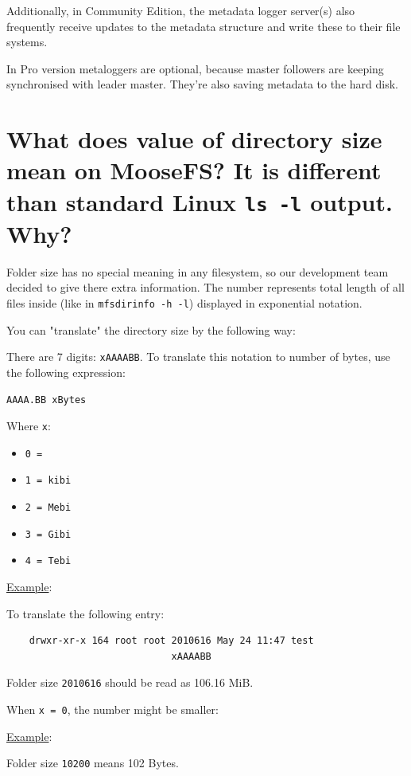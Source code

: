 \documentclass[a4paper,11pt,english]{report}
\def\code#1{\texttt{#1}}
\begin{document}
		Additionally, in Community Edition, the metadata logger server(s) also frequently receive updates to the metadata structure and write these to their file systems.
		
		In Pro version metaloggers are optional, because master followers are keeping synchronised with leader master. They're also saving metadata to the hard disk.
		
		\section{What does value of directory size mean on MooseFS? It is different than standard Linux \code{ls -l} output. Why?}
		Folder size has no special meaning in any filesystem, so our development team decided to give there extra information. The number represents total length of all files inside (like in \code{mfsdirinfo -h -l}) displayed in exponential notation.

		You can "translate" the directory size by the following way:

		There are 7 digits: \code{xAAAABB}. To translate this notation to number of bytes, use the following expression:

		\code{AAAA.BB xBytes}
		
		Where \code{x}:
		\begin{itemize}
			\item \code{0 =}
			\item \code{1 = kibi}
			\item \code{2 = Mebi}
			\item \code{3 = Gibi}
			\item \code{4 = Tebi}
		\end{itemize}

		\bigskip

		\underline{Example}:
		
		To translate the following entry:
		
		\begin{lstlisting}
	drwxr-xr-x 164 root root 2010616 May 24 11:47 test
	                         xAAAABB
		\end{lstlisting}

		Folder size \code{2010616} should be read as 106.16 MiB.
		
		\bigskip
		
		When \code{x = 0}, the number might be smaller:
		
		\underline{Example}:
		
		Folder size \code{10200} means 102 Bytes.
\end{document}
